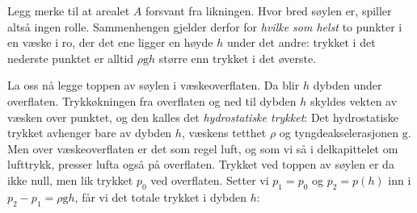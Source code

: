 Legg merke til at arealet $A$ forsvant fra likningen. Hvor bred søylen er, spiller altså ingen rolle. Sammenhengen gjelder derfor for \emph{hvilke som helst} to punkter i en væske i ro, der det ene ligger en høyde $h$ under det andre: trykket i det nederste punktet er alltid $\rho\mathrm{g}h$ større enn trykket i det øverste.

La oss nå legge toppen av søylen i væskeoverflaten. Da blir $h$ dybden under overflaten. Trykkøkningen fra overflaten og ned til dybden $h$ skyldes vekten av væsken over punktet, og den kalles det \emph{hydrostatiske trykket}:
Det hydrostatiske trykket avhenger bare av dybden $h$, væskens tetthet $\rho$ og tyngdeakselerasjonen $\mathrm{g}$. Men over væskeoverflaten er det som regel luft, og som vi så i delkapittelet om lufttrykk, presser lufta også på overflaten. Trykket ved toppen av søylen er da ikke null, men lik trykket $p_0$ ved overflaten. Setter vi $p_1 = p_0$ og $p_2 = p(h)$ inn i $p_2 - p_1 = \rho\mathrm{g}h$, får vi det totale trykket i dybden $h$:


